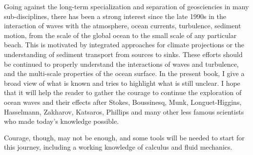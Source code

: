 Going against the long-term specialization and separation of geosciencies in many sub-disciplines, 
there has been a strong interest since the late 1990s in the interaction of waves with the atmosphere, ocean currents, 
turbulence, sediment motion, from the scale of the global ocean to the small scale of any particular beach. This is motivated by 
integrated approaches for climate projections or the understanding of sediment transport from sources to sinks. 
These efforts should be continued to properly understand the interactions of waves and turbulence, and the multi-scale 
properties of the ocean surface. 
In the present book, I give a broad view of what is known and tries to highlight what is still unclear. I hope that it will help the reader to gather the courage to continue the exploration of ocean waves and their effects after Stokes, Boussinesq, Munk, Longuet-Higgins, Hasselmann, Zakharov, Katsaros, Phillips and many other less famous scientists who made today's knowledge possible. 

Courage, though, may not be enough, and some tools will be needed to start for this journey, including 
a working knowledge of calculus and fluid mechanics. 

